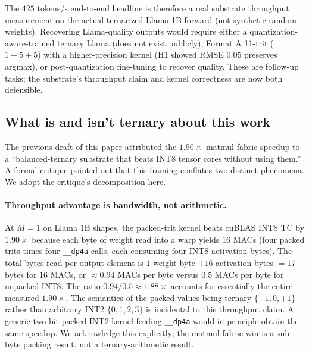 \documentclass{article}
\begin{document}
The $425$ tokens/s end-to-end headline is therefore a real substrate
throughput measurement on the actual ternarized Llama 1B forward (not
synthetic random weights). Recovering Llama-quality outputs would
require either a quantization-aware-trained ternary Llama (does not
exist publicly), Format A 11-trit ($1+5+5$) with a higher-precision
kernel ({H1} showed {RMSE} $0.05$ preserves argmax), or
post-quantization fine-tuning to recover quality. These are
follow-up tasks; the substrate's throughput claim and kernel
correctness are now both defensible.

\subsection{What is and isn't ternary about this work}
\label{sec:what-is-ternary}

The previous draft of this paper attributed the $1.90\times$ matmul
fabric speedup to a ``balanced-ternary substrate that beats {INT8}
tensor cores without using them.'' A formal critique
\citep{cuevas-formal-2026} pointed out that this framing conflates two
distinct phenomena. We adopt the critique's decomposition here.

\paragraph{Throughput advantage is bandwidth, not arithmetic.}
At $M=1$ on Llama 1B shapes, the packed-trit kernel beats cuBLAS {INT8}
{TC} by $1.90\times$ because each byte of weight read into a warp
yields $16$ {MAC}s (four packed trits times four \texttt{\_\_dp4a}
calls, each consuming four {INT8} activation bytes). The total bytes
read per output element is $1$ weight byte $+ 16$ activation bytes
$= 17$ bytes for $16$ {MAC}s, or $\approx 0.94$ {MAC}s per byte versus
$0.5$ {MAC}s per byte for unpacked {INT8}. The ratio $0.94 / 0.5
\approx 1.88\times$ accounts for essentially the entire measured
$1.90\times$. The semantics of the packed values being ternary
$\{-1, 0, +1\}$ rather than arbitrary {INT2} $\{0, 1, 2, 3\}$ is
incidental to this throughput claim. A generic two-bit packed
{INT2} kernel feeding \texttt{\_\_dp4a} would in principle obtain the
same speedup. We acknowledge this explicitly; the matmul-fabric win
is a sub-byte packing result, not a ternary-arithmetic result.
\end{document}
